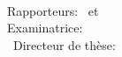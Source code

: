 \hfill
\vfill
{
	\small
	\textit{\thesisTitle} \\
    \thesisName\ \textcopyright\ \thesisDate \\
	\thesisSubject\\
	Rapporteurs: \thesisFirstReviewer\ et \thesisSecondReviewer \\
    Examinatrice: \thesisFirstExaminer\\\
	Directeur de th\`ese: \thesisFirstSupervisor\\
	\textbf{\thesisUniversity} \\
    \thesisUniversityDepartment \\[1.5em]
    \textbf{\thesisUniversityGroup} \\
	\thesisUniversityInstitute \\
    \thesisUniversityStreetAddress \\
	\thesisUniversityPostalCode\ \thesisUniversityCity~\thesisUniversityCityCedex
}